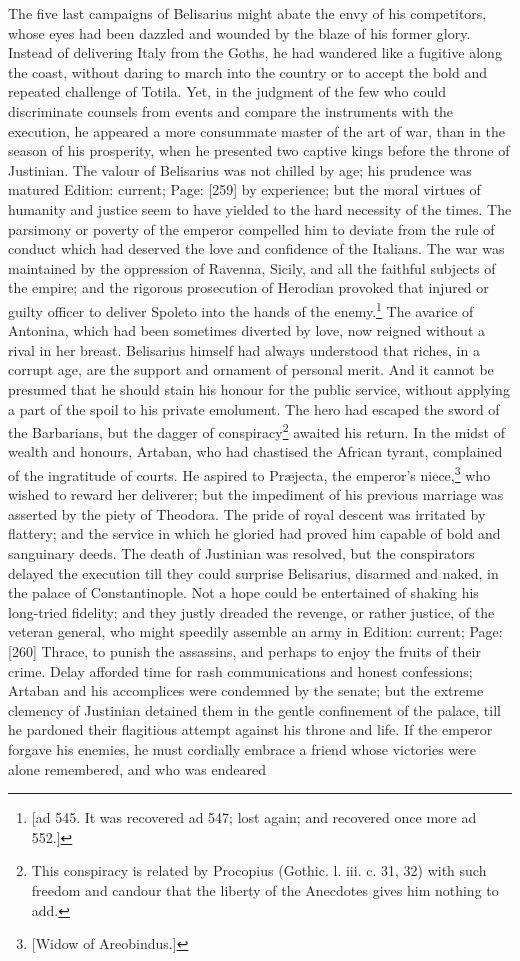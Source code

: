 The five last campaigns of Belisarius might abate the envy of his competitors, whose eyes had been dazzled and wounded by the blaze of his former glory. Instead of delivering Italy from the Goths, he had wandered like a fugitive along the coast, without daring to march into the country or to accept the bold and repeated challenge of Totila. Yet, in the judgment of the few who could discriminate counsels from events and compare the instruments with the execution, he appeared a more consummate master of the art of war, than in the season of his prosperity, when he presented two captive kings before the throne of Justinian. The valour of Belisarius was not chilled by age; his prudence was matured Edition: current; Page: [259] by experience; but the moral virtues of humanity and justice seem to have yielded to the hard necessity of the times. The parsimony or poverty of the emperor compelled him to deviate from the rule of conduct which had deserved the love and confidence of the Italians. The war was maintained by the oppression of Ravenna, Sicily, and all the faithful subjects of the empire; and the rigorous prosecution of Herodian provoked that injured or guilty officer to deliver Spoleto into the hands of the enemy.\footnote{[ad 545. It was recovered ad 547; lost again; and recovered once more ad 552.]} The avarice of Antonina, which had been sometimes diverted by love, now reigned without a rival in her breast. Belisarius himself had always understood that riches, in a corrupt age, are the support and ornament of personal merit. And it cannot be presumed that he should stain his honour for the public service, without applying a part of the spoil to his private emolument. The hero had escaped the sword of the Barbarians, but the dagger of conspiracy\footnote{This conspiracy is related by Procopius (Gothic. l. iii. c. 31, 32) with such freedom and candour that the liberty of the Anecdotes gives him nothing to add.} awaited his return. In the midst of wealth and honours, Artaban, who had chastised the African tyrant, complained of the ingratitude of courts. He aspired to Præjecta, the emperor\texthebrew{}’s niece,\footnote{[Widow of Areobindus.]} who wished to reward her deliverer; but the impediment of his previous marriage was asserted by the piety of Theodora. The pride of royal descent was irritated by flattery; and the service in which he gloried had proved him capable of bold and sanguinary deeds. The death of Justinian was resolved, but the conspirators delayed the execution till they could surprise Belisarius, disarmed and naked, in the palace of Constantinople. Not a hope could be entertained of shaking his long-tried fidelity; and they justly dreaded the revenge, or rather justice, of the veteran general, who might speedily assemble an army in Edition: current; Page: [260] Thrace, to punish the assassins, and perhaps to enjoy the fruits of their crime. Delay afforded time for rash communications and honest confessions; Artaban and his accomplices were condemned by the senate; but the extreme clemency of Justinian detained them in the gentle confinement of the palace, till he pardoned their flagitious attempt against his throne and life. If the emperor forgave his enemies, he must cordially embrace a friend whose victories were alone remembered, and who was endeared 